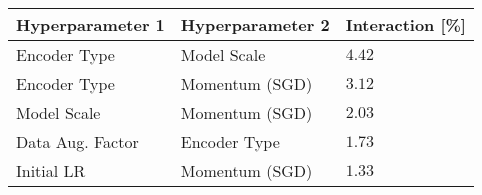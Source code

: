 \begin{tabular}{lll}
\toprule
Hyperparameter 1 & Hyperparameter 2 & Interaction [\%] \\
\midrule
Encoder Type & Model Scale & $4.42$ \\
Encoder Type & Momentum (SGD) & $3.12$ \\
Model Scale & Momentum (SGD) & $2.03$ \\
Data Aug. Factor & Encoder Type & $1.73$ \\
Initial LR & Momentum (SGD) & $1.33$ \\
\bottomrule
\end{tabular}
